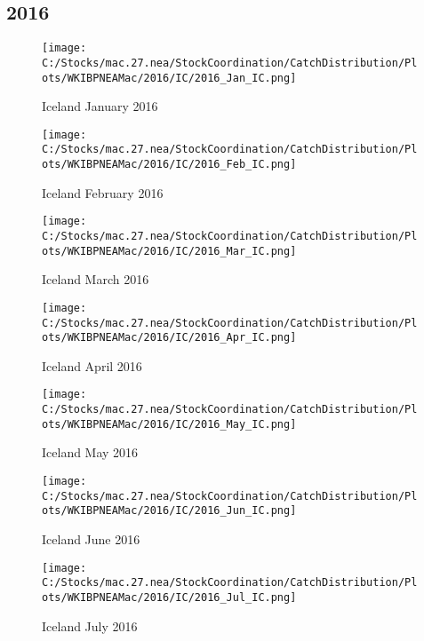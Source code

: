 \documentclass{article}
\begin{document}
\subsection{2016}



\begin{figure}[h]
	\centering
		\texttt{[image: C:/Stocks/mac.27.nea/StockCoordination/CatchDistribution/Plots/WKIBPNEAMac/2016/IC/2016\_Jan\_IC.png]}
	\caption{Iceland January 2016}
	\label{fig:2016_Jan_IC}
\end{figure}

\begin{figure}
	\centering
		\texttt{[image: C:/Stocks/mac.27.nea/StockCoordination/CatchDistribution/Plots/WKIBPNEAMac/2016/IC/2016\_Feb\_IC.png]}
	\caption{Iceland February 2016}
	\label{fig:2016_Feb_IC}
\end{figure}

\begin{figure}
	\centering
		\texttt{[image: C:/Stocks/mac.27.nea/StockCoordination/CatchDistribution/Plots/WKIBPNEAMac/2016/IC/2016\_Mar\_IC.png]}
	\caption{Iceland March 2016}
	\label{fig:2016_Mar_IC}
\end{figure}

\begin{figure}
	\centering
		\texttt{[image: C:/Stocks/mac.27.nea/StockCoordination/CatchDistribution/Plots/WKIBPNEAMac/2016/IC/2016\_Apr\_IC.png]}
	\caption{Iceland April 2016}
	\label{fig:2016_Apr_IC}
\end{figure}

\begin{figure}
	\centering
		\texttt{[image: C:/Stocks/mac.27.nea/StockCoordination/CatchDistribution/Plots/WKIBPNEAMac/2016/IC/2016\_May\_IC.png]}
	\caption{Iceland May 2016}
	\label{fig:2016_May_IC}
\end{figure}

\begin{figure}
	\centering
		\texttt{[image: C:/Stocks/mac.27.nea/StockCoordination/CatchDistribution/Plots/WKIBPNEAMac/2016/IC/2016\_Jun\_IC.png]}
	\caption{Iceland June 2016}
	\label{fig:2016_Jun_IC}
\end{figure}

\begin{figure}
	\centering
		\texttt{[image: C:/Stocks/mac.27.nea/StockCoordination/CatchDistribution/Plots/WKIBPNEAMac/2016/IC/2016\_Jul\_IC.png]}
	\caption{Iceland July 2016}
	\label{fig:2016_Jul_IC}
\end{figure}
\end{document}
